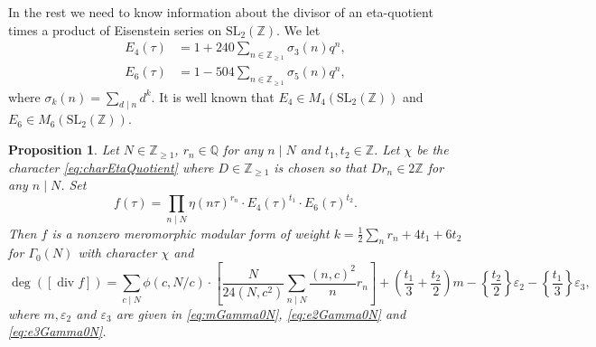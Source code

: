 \documentclass[12pt]{amsart}
\numberwithin{equation}{section}
\theoremstyle{plain}
\newtheorem{prop}[thm]{Proposition}
\theoremstyle{definition}
\theoremstyle{remark}
\renewcommand\div{\mathop{\mathrm{div}}}
\newcommand\numZ{\mathbb{Z}}
\newcommand\numQ{\mathbb{Q}}
\newcommand\numgeq[2]{\mathbb{#1}_{\geq #2}}
\newcommand\slZ{\mathrm{SL}_2(\mathbb{Z})}
\begin{document}
In the rest we need to know information about the divisor of an eta-quotient times a product of Eisenstein series on $\slZ$. We let
\begin{align*}
E_4(\tau)&=1+240\sum_{n\in\numgeq{Z}{1}}\sigma_3(n)q^n,\\
E_6(\tau)&=1-504\sum_{n\in\numgeq{Z}{1}}\sigma_5(n)q^n,
\end{align*}
where $\sigma_k(n)=\sum_{d\mid n}d^k$. It is well known that $E_4\in M_4({\slZ})$ and $E_6\in M_6({\slZ})$.
\begin{prop}
\label{prop:etaEisenstein}
Let $N\in\numgeq{Z}{1}$, $r_n\in\numQ$ for any $n\mid N$ and $t_1,t_2\in\numZ$. Let $\chi$ be the character \eqref{eq:charEtaQuotient} where $D\in\numgeq{Z}{1}$ is chosen so that $Dr_n\in2\numZ$ for any $n \mid N$. Set
\begin{equation*}
f(\tau)=\prod_{n \mid N}\eta(n\tau)^{r_n}\cdot E_4(\tau)^{t_1}\cdot E_6(\tau)^{t_2}.
\end{equation*}
Then $f$ is a nonzero meromorphic modular form of weight $k=\frac{1}{2}\sum_{n}r_n+4t_1+6t_2$ for $\Gamma_0(N)$ with character $\chi$ and
\begin{equation*}
\deg\left([\div f]\right)=\sum_{c\mid N}\phi(c,N/c)\cdot\left[\frac{N}{24(N,c^2)}\sum_{n \mid N}\frac{(n,c)^2}{n}r_n\right]+\left(\frac{t_1}{3}+\frac{t_2}{2}\right)m-\left\{\frac{t_2}{2}\right\}\varepsilon_2-\left\{\frac{t_1}{3}\right\}\varepsilon_3,
\end{equation*}
where $m,\varepsilon_2$ and $\varepsilon_3$ are given in \eqref{eq:mGamma0N}, \eqref{eq:e2Gamma0N} and \eqref{eq:e3Gamma0N}.
\end{prop}
\end{document}
